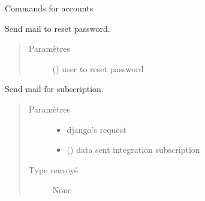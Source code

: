 \documentclass[letterpaper,10pt,french]{sphinxmanual}
\begin{document}
\label{\detokenize{accounts:module-accounts.commands.commands}}
Commands for accounts

\begin{fulllineitems}
\label{\detokenize{accounts:accounts.commands.commands.mail_password}}
Send mail to reset password.
\begin{quote}\begin{description}
\item[{Paramètres}] \leavevmode
{} () \textendash{} user to reset password

\end{description}\end{quote}

\end{fulllineitems}


\begin{fulllineitems}
\label{\detokenize{accounts:accounts.commands.commands.mail_subscription}}
Send mail for subscription.
\begin{quote}\begin{description}
\item[{Paramètres}] \leavevmode\begin{itemize}
\item {}
 \textendash{} django’s request

\item {}
 () \textendash{} data sent integration subscription

\end{itemize}

\item[{Type renvoyé}] \leavevmode
None

\end{description}\end{quote}

\end{fulllineitems}
\end{document}

